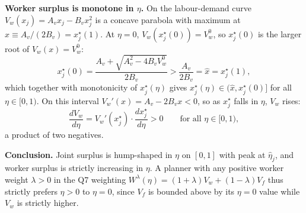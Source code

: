 \documentclass[a4paper,11pt]{article}
\begin{document}
\textbf{Worker surplus is monotone in $\eta$.} On the labour-demand curve $V_w(x_j)=A_v x_j-B_vx_j^{2}$ is a concave parabola with maximum at $\hat x\!\equiv\!A_v/(2B_v)\!=\!x_j^{\star}(1)$. At $\eta\!=\!0$, $V_w(x_j^{\star}(0))=V_w^{0}$, so $x_j^{\star}(0)$ is the larger root of $V_w(x)=V_w^{0}$:
\[
x_j^{\star}(0)=\frac{A_v+\sqrt{A_v^{2}-4B_vV_w^{0}}}{2B_v}>\frac{A_v}{2B_v}=\hat x=x_j^{\star}(1),
\]
which together with monotonicity of $x_j^{\star}(\eta)$ gives $x_j^{\star}(\eta)\in(\hat x,x_j^{\star}(0)]$ for all $\eta\in[0,1)$. On this interval $V_w'(x)=A_v-2B_vx<0$, so as $x_j^{\star}$ falls in $\eta$, $V_w$ rises:
\[
\frac{dV_w}{d\eta}=V_w'(x_j^{\star})\cdot\frac{dx_j^{\star}}{d\eta}>0\qquad\text{for all }\eta\in[0,1),
\]
a product of two negatives.

\textbf{Conclusion.} Joint surplus is hump-shaped in $\eta$ on $[0,1]$ with peak at $\hat\eta_j$, and worker surplus is strictly increasing in $\eta$. A planner with any positive worker weight $\lambda>0$ in the Q7 weighting $W^{\lambda}(\eta)=(1+\lambda)V_w+(1-\lambda)V_f$ thus strictly prefers $\eta\!>\!0$ to $\eta\!=\!0$, since $V_f$ is bounded above by its $\eta\!=\!0$ value while $V_w$ is strictly higher.
\end{document}
